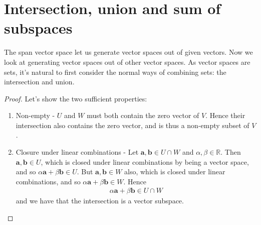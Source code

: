 

\section{Intersection, union and sum of subspaces}
The span vector space let us generate vector spaces out of given vectors. Now we look at generating vector spaces out of other vector spaces. As vector spaces are sets, it's natural to first consider the normal ways of combining sets: the intersection and union.


\begin{proof} Let's show the two sufficient properties:
\begin{enumerate}
\item Non-empty - $U$ and $W$ must both contain the zero vector of $V$. Hence their intersection also contains the zero vector, and is thus a non-empty subset of $V$.

\item Closure under linear combinations - Let $\textbf{a}, \textbf{b} \in U \cap W$ and $\alpha, \beta \in \mathbb{R}$. Then $\textbf{a}, \textbf{b} \in U$, which is closed under linear combinations by being a vector space, and so $\alpha\textbf{a}+\beta\textbf{b} \in U$. But $\textbf{a}, \textbf{b} \in W$ also, which is closed under linear combinations, and so $\alpha\textbf{a}+\beta\textbf{b} \in W$. Hence
\begin{align*}
\alpha\textbf{a}+\beta\textbf{b} \in U\cap W
\end{align*}
and we have that the intersection is a vector subspace.
\end{enumerate}
\end{proof} 



